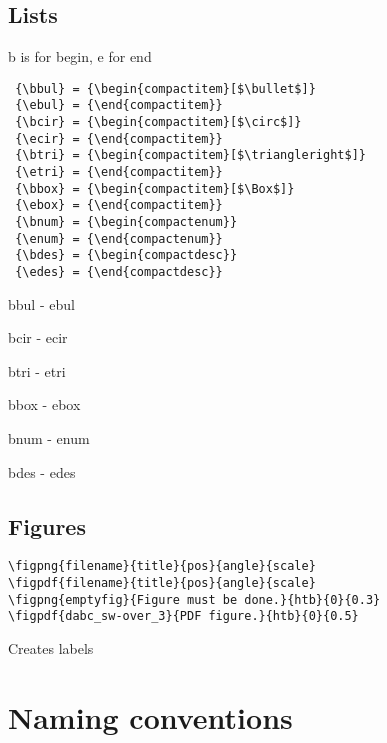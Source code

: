 \subsection{Lists}
b is for begin, e for end
\begin{verbatim}
 {\bbul} = {\begin{compactitem}[$\bullet$]}
 {\ebul} = {\end{compactitem}}
 {\bcir} = {\begin{compactitem}[$\circ$]}
 {\ecir} = {\end{compactitem}}
 {\btri} = {\begin{compactitem}[$\triangleright$]}
 {\etri} = {\end{compactitem}}
 {\bbox} = {\begin{compactitem}[$\Box$]}
 {\ebox} = {\end{compactitem}}
 {\bnum} = {\begin{compactenum}}
 {\enum} = {\end{compactenum}}
 {\bdes} = {\begin{compactdesc}}
 {\edes} = {\end{compactdesc}}
\end{verbatim}
\bbul
\item bbul - ebul
\ebul
\bcir
\item bcir - ecir
\ecir
\btri
\item btri - etri
\etri
\bbox
\item bbox - ebox
\ebox
\bnum
\item bnum - enum
\enum
\bdes
\item[item] bdes - edes
\edes
\clearpage
\subsection{Figures}
\begin{verbatim}
\figpng{filename}{title}{pos}{angle}{scale}
\figpdf{filename}{title}{pos}{angle}{scale}
\figpng{emptyfig}{Figure must be done.}{htb}{0}{0.3}
\figpdf{dabc_sw-over_3}{PDF figure.}{htb}{0}{0.5}
\end{verbatim}
Creates labels 
\section{Naming conventions}
